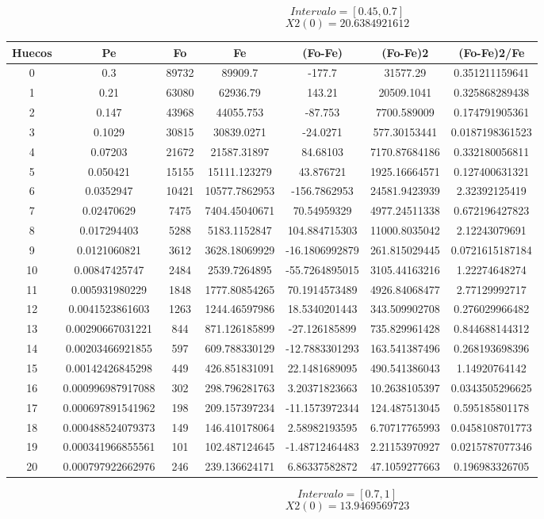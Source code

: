 \documentclass{article}
\begin{document}
$$
Intervalo = [0.45, 0.7]
$$
$$
X2(0) = 20.6384921612
$$
\begin{tabular}{|c|c|c|c|c|c|c|}
Huecos&Pe&Fo&Fe&(Fo{-}Fe)&(Fo{-}Fe)2&(Fo{-}Fe)2/Fe\\
\hline
0&0.3&89732&89909.7&{-}177.7&31577.29&0.351211159641\\
\hline
1&0.21&63080&62936.79&143.21&20509.1041&0.325868289438\\
\hline
2&0.147&43968&44055.753&{-}87.753&7700.589009&0.174791905361\\
\hline
3&0.1029&30815&30839.0271&{-}24.0271&577.30153441&0.0187198361523\\
\hline
4&0.07203&21672&21587.31897&84.68103&7170.87684186&0.332180056811\\
\hline
5&0.050421&15155&15111.123279&43.876721&1925.16664571&0.127400631321\\
\hline
6&0.0352947&10421&10577.7862953&{-}156.7862953&24581.9423939&2.32392125419\\
\hline
7&0.02470629&7475&7404.45040671&70.54959329&4977.24511338&0.672196427823\\
\hline
8&0.017294403&5288&5183.1152847&104.884715303&11000.8035042&2.12243079691\\
\hline
9&0.0121060821&3612&3628.18069929&{-}16.1806992879&261.815029445&0.0721615187184\\
\hline
10&0.00847425747&2484&2539.7264895&{-}55.7264895015&3105.44163216&1.22274648274\\
\hline
11&0.005931980229&1848&1777.80854265&70.1914573489&4926.84068477&2.77129992717\\
\hline
12&0.0041523861603&1263&1244.46597986&18.5340201443&343.509902708&0.276029966482\\
\hline
13&0.00290667031221&844&871.126185899&{-}27.126185899&735.829961428&0.844688144312\\
\hline
14&0.00203466921855&597&609.788330129&{-}12.7883301293&163.541387496&0.268193698396\\
\hline
15&0.00142426845298&449&426.851831091&22.1481689095&490.541386043&1.14920764142\\
\hline
16&0.000996987917088&302&298.796281763&3.20371823663&10.2638105397&0.0343505296625\\
\hline
17&0.000697891541962&198&209.157397234&{-}11.1573972344&124.487513045&0.595185801178\\
\hline
18&0.000488524079373&149&146.410178064&2.58982193595&6.70717765993&0.0458108701773\\
\hline
19&0.000341966855561&101&102.487124645&{-}1.48712464483&2.21153970927&0.0215787077346\\
\hline
20&0.000797922662976&246&239.136624171&6.86337582872&47.1059277663&0.196983326705\\
\end{tabular}
$$
Intervalo = [0.7, 1]
$$
$$
X2(0) = 13.9469569723
$$
\end{document}
